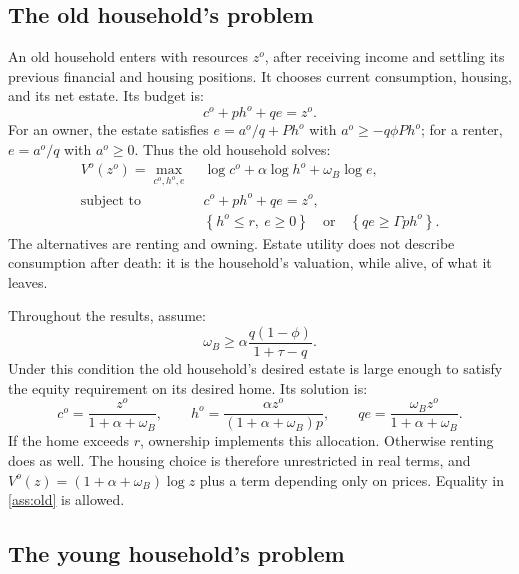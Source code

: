 \documentclass[11pt]{article}
\begin{document}
\subsection{The old household's problem}

An old household enters with resources $z^o$, after receiving income and
settling its previous financial and housing positions. It chooses current
consumption, housing, and its net estate. Its budget is:
\begin{equation}
c^o+ph^o+qe=z^o.
\label{eq:old_budget}
\end{equation}
For an owner, the estate satisfies $e=a^o/q+Ph^o$ with
$a^o\ge-q\phi Ph^o$; for a renter, $e=a^o/q$ with $a^o\ge0$.
Thus the old household solves:
\begin{equation}
\begin{split}
V^o(z^o)=\max_{c^o,h^o,e}\;&\log c^o+\alpha\log h^o+\omega_B\log e,\\
\text{subject to }&c^o+ph^o+qe=z^o,\\
&\left\{h^o\le r,\ e\ge0\right\}
\quad\text{or}\quad\left\{qe\ge\Gamma ph^o\right\}.
\end{split}
\label{eq:new_old_owner}
\end{equation}
The alternatives are renting and owning. Estate utility does not describe
consumption after death: it is the household's valuation, while alive, of
what it leaves.

Throughout the results, assume:
\begin{equation}
\omega_B\ge\alpha\frac{q(1-\phi)}{1+\tau-q}.
\tag{A1}\label{ass:old}
\end{equation}
Under this condition the old household's desired estate is large enough to
satisfy the equity requirement on its desired home. Its solution is:
\begin{equation}
c^o=\frac{z^o}{1+\alpha+\omega_B},\qquad
h^o=\frac{\alpha z^o}{(1+\alpha+\omega_B)p},\qquad
qe=\frac{\omega_B z^o}{1+\alpha+\omega_B}.
\label{eq:old_solution}
\end{equation}
If the home exceeds $r$, ownership implements this allocation. Otherwise
renting does as well. The housing choice is therefore unrestricted in real
terms, and $V^o(z)=(1+\alpha+\omega_B)\log z$ plus a term depending only on prices. Equality
in \eqref{ass:old} is allowed.

\subsection{The young household's problem}
\end{document}
